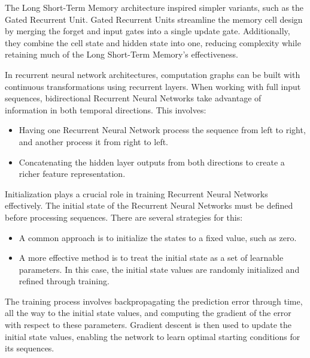 The Long Short-Term Memory architecture inspired simpler variants, such as the Gated Recurrent Unit. 
Gated Recurrent Units streamline the memory cell design by merging the forget and input gates into a single update gate.
Additionally, they combine the cell state and hidden state into one, reducing complexity while retaining much of the Long Short-Term Memory's effectiveness.

In recurrent neural network architectures, computation graphs can be built with continuous transformations using recurrent layers. 
When working with full input sequences, bidirectional Recurrent Neural Networks take advantage of information in both temporal directions. 
This involves:
\begin{itemize}
    \item Having one Recurrent Neural Network process the sequence from left to right, and another process it from right to left.
    \item Concatenating the hidden layer outputs from both directions to create a richer feature representation.
\end{itemize}

Initialization plays a crucial role in training Recurrent Neural Networks effectively. 
The initial state of the Recurrent Neural Networks must be defined before processing sequences. 
There are several strategies for this:
\begin{itemize}
    \item A common approach is to initialize the states to a fixed value, such as zero.
    \item A more effective method is to treat the initial state as a set of learnable parameters. 
        In this case, the initial state values are randomly initialized and refined through training.
\end{itemize}
The training process involves backpropagating the prediction error through time, all the way to the initial state values, and computing the gradient of the error with respect to these parameters. 
Gradient descent is then used to update the initial state values, enabling the network to learn optimal starting conditions for its sequences.